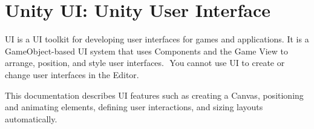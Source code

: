 \chapter{Unity UI\+: Unity User Interface}
\hypertarget{md__library_2_package_cache_2com_8unity_8ugui_0d1_80_80_2_documentation_0i_2index}{}\label{md__library_2_package_cache_2com_8unity_8ugui_0d1_80_80_2_documentation_0i_2index}
\label{md__library_2_package_cache_2com_8unity_8ugui_0d1_80_80_2_documentation_0i_2index_autotoc_md1336}%
%
  UI is a UI toolkit for developing user interfaces for games and applications. It is a Game\+Object-\/based UI system that uses Components and the Game View to arrange, position, and style user interfaces. ​ You cannot use  UI to create or change user interfaces in the  Editor.

This documentation describes  UI features such as creating a Canvas, positioning and animating elements, defining user interactions, and sizing layouts automatically. 